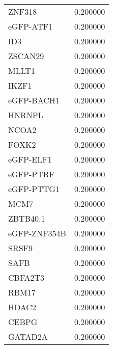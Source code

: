 \begin{longtable}{lr}
          ZNF318 &  0.200000 \\
       eGFP-ATF1 &  0.200000 \\
             ID3 &  0.200000 \\
         ZSCAN29 &  0.200000 \\
           MLLT1 &  0.200000 \\
           IKZF1 &  0.200000 \\
      eGFP-BACH1 &  0.200000 \\
          HNRNPL &  0.200000 \\
           NCOA2 &  0.200000 \\
           FOXK2 &  0.200000 \\
       eGFP-ELF1 &  0.200000 \\
       eGFP-PTRF &  0.200000 \\
      eGFP-PTTG1 &  0.200000 \\
            MCM7 &  0.200000 \\
        ZBTB40.1 &  0.200000 \\
    eGFP-ZNF354B &  0.200000 \\
           SRSF9 &  0.200000 \\
            SAFB &  0.200000 \\
         CBFA2T3 &  0.200000 \\
           RBM17 &  0.200000 \\
           HDAC2 &  0.200000 \\
           CEBPG &  0.200000 \\
         GATAD2A &  0.200000 \\
\end{longtable}
